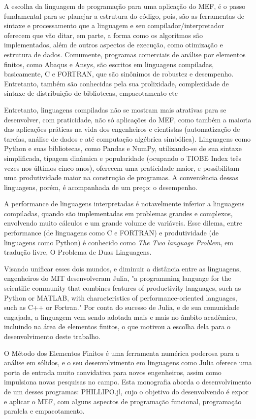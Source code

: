 A escolha da linguagem de programação para uma aplicação do MEF, é o passo fundamental para se planejar a estrutura do código, pois, são as ferramentas de sintaxe e processamento que a linguagem e seu compilador/interpretador oferecem que vão ditar, em parte, a forma como os algoritmos são implementados, além de outros aspectos de execução, como otimização e estrutura de dados. Comumente, programas comerciais de análise por elementos finitos, como Abaqus e Ansys, são escritos em linguagens compiladas, basicamente, C e FORTRAN, que são sinônimos de robustez e desempenho. Entretanto, também são conhecidas pela sua prolixidade, complexidade de sintaxe de distribuição de bibliotecas, empacotamento etc 

Entretanto, linguagens compiladas não se mostram mais atrativas para se desenvolver, com praticidade, não só aplicações do MEF, como também a maioria das aplicações práticas na vida dos engenheiros e cientistas (automatização de tarefas, análise de dados e até computação algébrica simbólica). Linguagens como Python e suas bibliotecas, como Pandas e NumPy, utilizando-se de sua sintaxe simplificada, tipagem dinâmica e popularidade (ocupando o TIOBE Index três vezes nos últimos cinco anos), oferecem uma praticidade maior, e possibilitam uma produtividade maior na construção de programas. A conveniência dessas linguagens, porém, é acompanhada de um preço: o desempenho.

A performance de linguagens interpretadas é notavelmente inferior a linguagens compiladas, quando são implementadas em problemas grandes e complexos, envolvendo muito cálculos e um grande volume de variáveis. Esse dilema, entre performance (de linguagens como C e FORTRAN) e produtividade (de linguagens como Python) é conhecido como \emph{The Two language Problem}, em tradução livre, O Problema de Duas Linguagens.

Visando unificar esses dois mundos, e diminuir a distância entre as linguagens, engenheiros do MIT desenvolveram Julia, "a programming language for the scientific community that combines features of productivity languages, such as Python or MATLAB, with characteristics of performance-oriented languages, such as C++ or Fortran." \cite[tradução livre]{Bezanson} Por conta do sucesso de Julia, e de sua comunidade engajada, a linguagem vem sendo adotada mais e mais no âmbito acadêmico, incluindo na área de elementos finitos, o que motivou a escolha dela para o desenvolvimento deste trabalho.

O Método dos Elementos Finitos é uma ferramenta numérica poderosa para a análise em sólidos, e o seu desenvolvimento em linguagens como Julia oferece uma porta de entrada muito convidativa para novos engenheiros, assim como impulsiona novas pesquisas no campo. Esta monografia aborda o desenvolvimento de um desses programas: PHILLIPO.jl, cujo o objetivo do desenvolvendo é expor e aplicar o MEF, com alguns aspectos de programação funcional, programação paralela e empacotamento.



